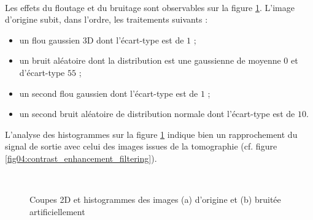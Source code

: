 \\Les effets du floutage et du bruitage sont observables sur la figure \ref{fig05:spheres_bruitage}. L'image d'origine subit, dans l'ordre, les traitements suivants :
\begin{itemize}
	\item un flou gaussien 3D dont l'écart-type est de $1$ ;
	\item un bruit aléatoire dont la distribution est une gaussienne de moyenne $0$ et d'écart-type $55$ ;
	\item un second flou gaussien dont l'écart-type est de $1$ ;
	\item un second bruit aléatoire de distribution normale dont l'écart-type est de $10$.
\end{itemize}
L'analyse des histogrammes sur la figure \ref{fig05:spheres_bruitage} indique bien un rapprochement du signal de sortie avec celui des images issues de la tomographie (cf. figure \ref{fig04:contrast_enhancement_filtering}).
\begin{figure}\centering
	\\
	\caption{\label{fig05:spheres_bruitage}Coupes 2D et histogrammes des images (a) d'origine et (b) bruitée artificiellement}
\end{figure}

